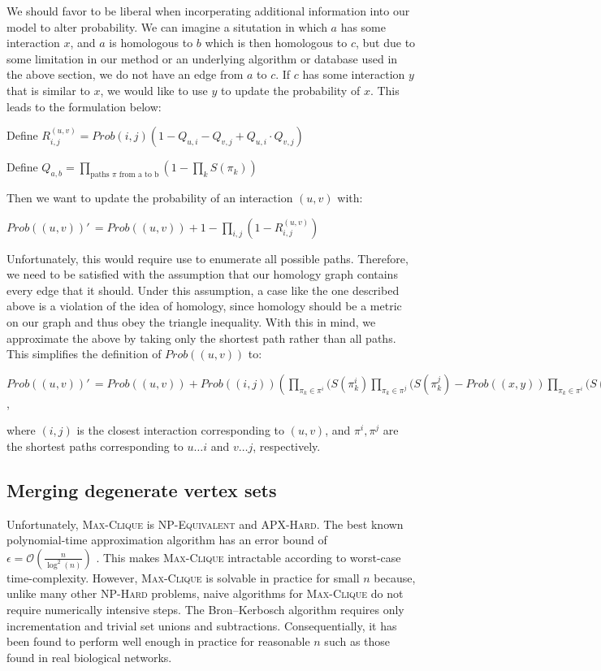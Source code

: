 \documentclass[12pt,twoside]{article}
\def\NI{\noindent}
\begin{document}
\NI We should favor to be liberal when incorperating additional information into our model to alter probability. We can imagine a situtation in which $a$ has some interaction $x$, and $a$ is homologous to $b$ which is then homologous to $c$, but due to some limitation in our method or an underlying algorithm or database used in the above section, we do not have an edge from $a$ to $c$. If $c$ has some interaction $y$ that is similar to $x$, we would like to use $y$ to update the probability of $x$. This leads to the formulation below:

\NI Define
$R_{i,j}^{(u,v)} = Prob(i,j) \left(1 - \displaystyle Q_{u,i} - Q_{v,j} + Q_{u,i} \cdot Q_{v,j} \right)$

\NI Define $Q_{a,b} = \displaystyle \prod_{\text{paths } \pi \text{ from a to b}} \left( 1 - \prod_{k} S(\pi_k) \right)$

\NI Then we want to update the probability of an interaction $(u,v)$ with:

\NI $Prob((u,v))'\,\! = Prob((u,v)) + 1 - \displaystyle \prod_{i,j}(1 - R_{i,j}^{(u,v)})$

\NI Unfortunately, this would require use to enumerate all possible paths. Therefore, we need to be satisfied with the assumption that our homology graph contains every edge that it should. Under this assumption, a case like the one described above is a violation of the idea of homology, since homology should be a metric on our graph and thus obey the triangle inequality. With this in mind, we approximate the above by taking only the shortest path rather than all paths. This simplifies the definition of $Prob((u,v))$ to:

\NI $Prob((u,v))'\,\! = Prob((u,v)) + \displaystyle Prob((i,j)) \left( \prod_{\pi_k \in \pi^i}(S(\pi_k^i) \prod_{\pi_k \in \pi^j}(S(\pi_k^j) - Prob((x,y)) \prod_{\pi_k \in \pi^i}(S(\pi_k^i) \prod_{\pi_k \in \pi^j}(S(\pi_k^j) \right)$,

\NI where $(i,j)$ is the closest interaction corresponding to $(u,v)$, and $\pi^i, \pi^j$ are the shortest paths corresponding to $u \ldots i$ and $v \ldots j$, respectively.

\subsection{Merging degenerate vertex sets}

\NI Unfortunately, \textsc{Max-Clique} is \textsc{NP-Equivalent} and \textsc{APX-Hard}. The best known polynomial-time approximation algorithm has an error bound of $\epsilon = \mathcal O \left(\frac{n}{\log^2(n)}\right)$ \cite{boppana}. This makes \textsc{Max-Clique} intractable according to worst-case time-complexity. However, \textsc{Max-Clique} is solvable in practice for small $n$ because, unlike many other \textsc{NP-Hard} problems, naive algorithms for \textsc{Max-Clique} do not require numerically intensive steps. The Bron--Kerbosch algorithm requires only incrementation and trivial set unions and subtractions. Consequentially, it has been found to perform well enough in practice for reasonable $n$ such as those found in real biological networks.
\end{document}
